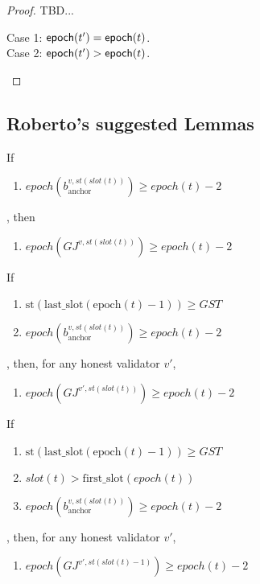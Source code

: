 \documentclass{article}
\begin{document}
\begin{proof}
    TBD...

    \begin{description}
        \item[Case 1: $\mathsf{epoch}(t') = \mathsf{epoch}(t)$.]
        \item[Case 2: $\mathsf{epoch}(t') > \mathsf{epoch}(t)$.]  
    \end{description}
\end{proof}

\subsection*{Roberto's suggested Lemmas}

\begin{lemma}
    If
    \begin{enumerate}
        \item $epoch(b_{\text{anchor}}^{v,st(slot(t))}) \geq epoch(t)-2$
    \end{enumerate},
    then
    \begin{enumerate}
        \item $epoch(GJ^{v,st(slot(t))}) \geq epoch(t)-2$
    \end{enumerate}
\end{lemma}

\begin{lemma}
    If
    \begin{enumerate}
        \item $\text{st}(\text{last\_slot}(\text{epoch}(t) - 1)) \geq GST$
        \item $epoch(b_{\text{anchor}}^{v,st(slot(t))}) \geq epoch(t)-2$
    \end{enumerate},
    then, for any honest validator $v'$,
    \begin{enumerate}
        \item $epoch(GJ^{v',st(slot(t))}) \geq epoch(t)-2$
    \end{enumerate}
\end{lemma}

\begin{lemma}\label{lem:gj-at-least-e-2}
    If
    \begin{enumerate}
        \item $\text{st}(\text{last\_slot}(\text{epoch}(t) - 1)) \geq GST$
        \item $slot(t) > \text{first\_slot}(epoch(t))$
        \item $epoch(b_{\text{anchor}}^{v,st(slot(t))}) \geq epoch(t)-2$
    \end{enumerate},
    then, for any honest validator $v'$,
    \begin{enumerate}
        \item $epoch(GJ^{v',st(slot(t)-1)}) \geq epoch(t)-2$
    \end{enumerate}
\end{lemma}
\end{document}
